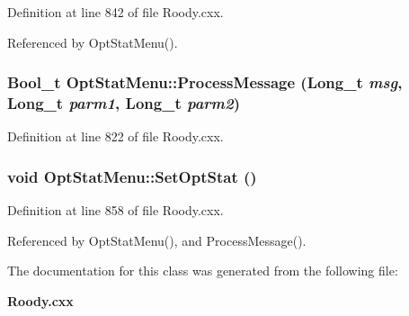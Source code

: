 Definition at line 842 of file Roody.cxx.

Referenced by OptStatMenu().
\subsubsection[{ProcessMessage}]{\setlength{\rightskip}{0pt plus 5cm}Bool\_\-t OptStatMenu::ProcessMessage (Long\_\-t {\em msg}, \/  Long\_\-t {\em parm1}, \/  Long\_\-t {\em parm2})\hspace{0.3cm}{\ttfamily  [inline]}}\label{classOptStatMenu_a1410a4fc1c23c448651a2460b6e9a8c0}


Definition at line 822 of file Roody.cxx.
\subsubsection[{SetOptStat}]{\setlength{\rightskip}{0pt plus 5cm}void OptStatMenu::SetOptStat ()\hspace{0.3cm}{\ttfamily  [inline]}}\label{classOptStatMenu_a7b24a69f8a79db451837e9a9e980be9d}


Definition at line 858 of file Roody.cxx.

Referenced by OptStatMenu(), and ProcessMessage().

The documentation for this class was generated from the following file:\begin{DoxyCompactItemize}
\item 
{\bf Roody.cxx}\end{DoxyCompactItemize}
